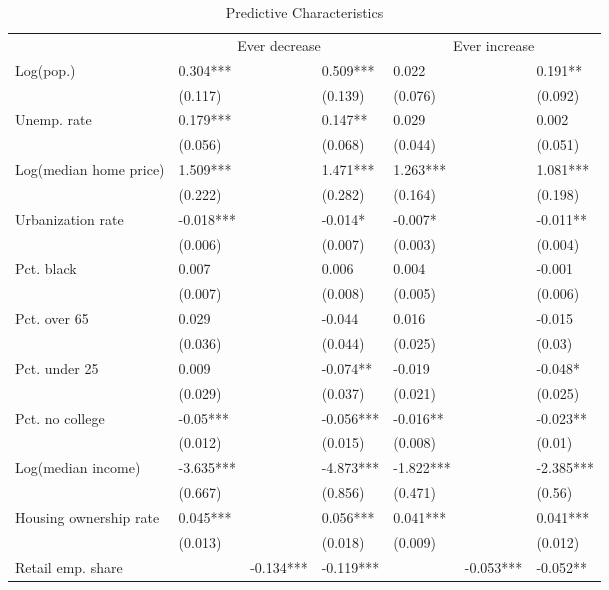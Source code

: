\documentclass[]{article}
\begin{document}
\begin{table}

\caption{\label{tab:table_predictive_res}Predictive Characteristics}
\centering
\begin{threeparttable}
\begin{tabular}[t]{lllllll}
\toprule
\multicolumn{1}{c}{ } & \multicolumn{3}{c}{Ever decrease} & \multicolumn{3}{c}{Ever increase} \\
\cmidrule(l{2pt}r{2pt}){2-4} \cmidrule(l{2pt}r{2pt}){5-7}
Log(pop.) & 0.304*** &  & 0.509*** & 0.022 &  & 0.191**\\
 & (0.117) &  & (0.139) & (0.076) &  & (0.092)\\
Unemp. rate & 0.179*** &  & 0.147** & 0.029 &  & 0.002\\
 & (0.056) &  & (0.068) & (0.044) &  & (0.051)\\
Log(median home price) & 1.509*** &  & 1.471*** & 1.263*** &  & 1.081***\\
\addlinespace
 & (0.222) &  & (0.282) & (0.164) &  & (0.198)\\
Urbanization rate & -0.018*** &  & -0.014* & -0.007* &  & -0.011**\\
 & (0.006) &  & (0.007) & (0.003) &  & (0.004)\\
Pct. black & 0.007 &  & 0.006 & 0.004 &  & -0.001\\
 & (0.007) &  & (0.008) & (0.005) &  & (0.006)\\
\addlinespace
Pct. over 65 & 0.029 &  & -0.044 & 0.016 &  & -0.015\\
 & (0.036) &  & (0.044) & (0.025) &  & (0.03)\\
Pct. under 25 & 0.009 &  & -0.074** & -0.019 &  & -0.048*\\
 & (0.029) &  & (0.037) & (0.021) &  & (0.025)\\
Pct. no college & -0.05*** &  & -0.056*** & -0.016** &  & -0.023**\\
\addlinespace
 & (0.012) &  & (0.015) & (0.008) &  & (0.01)\\
Log(median income) & -3.635*** &  & -4.873*** & -1.822*** &  & -2.385***\\
 & (0.667) &  & (0.856) & (0.471) &  & (0.56)\\
Housing ownership rate & 0.045*** &  & 0.056*** & 0.041*** &  & 0.041***\\
 & (0.013) &  & (0.018) & (0.009) &  & (0.012)\\
\addlinespace
Retail emp. share &  & -0.134*** & -0.119*** &  & -0.053*** & -0.052**\\

\end{tabular}
\end{threeparttable}
\end{table}
\end{document}
